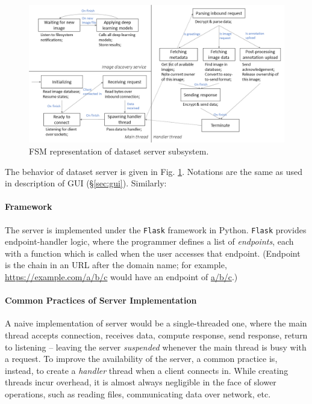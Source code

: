 \begin{figure}
    \centering
    \includegraphics[width=\textwidth]{figures/fsm2.png}
    \caption{FSM representation of dataset server subsystem.}
    \label{fig:fsm_server}
\end{figure}

The behavior of dataset server is given in Fig. \ref{fig:fsm_server}. Notations are the same as used in description of GUI (\S\ref{sec:gui}). Similarly:

\paragraph{Framework} The server is implemented under the \texttt{Flask} framework in Python. \texttt{Flask} provides endpoint-handler logic, where the programmer defines a list of \textit{endpoints}, each with a function which is called when the user accesses that endpoint. (Endpoint is the chain in an URL after the domain name; for example, \url{https://example.com/a/b/c} would have an endpoint of \url{a/b/c}.)

\paragraph{Common Practices of Server Implementation} A naive implementation of server would be a single-threaded one, where the main thread accepts connection, receives data, compute response, send response, return to listening -- leaving the server \textit{suspended} whenever the main thread is busy with a request. To improve the availability of the server, a common practice is, instead, to create a \textit{handler} thread when a client connects in. While creating threads incur overhead, it is almost always negligible in the face of slower operations, such as reading files, communicating data over network, etc.

